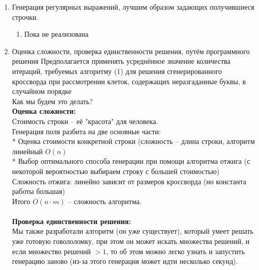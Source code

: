 \documentclass[12pt]{report}
\begin{document}
\begin{enumerate}
\newpage

\item Генерация регулярных выражений, лучшим образом задающих получившиеся строчки.
\begin{enumerate} 
\item Пока не реализована
\end{enumerate} 

\newpage

\item Оценка сложности, проверка единственности решения, путём программного решения
        Предполагается применять усреднённое значение количества итераций, требуемых алгоритму (1) для решения сгенерированного кроссворда при рассмотрении клеток, содержащих неразгаданные буквы, в случайном порядке
        \\
        
        Как мы будем это делать? \\
        {\bf Оценка сложности: } \\
        Стоимость строки -- её "красота" для человека. \\
        Генерация поля разбита на две основные части: \\
        * Оценка стоимости конкретной строки (сложность -- длина строки, алгоритм линейный $O(n)$ \\
        * Выбор оптимального способа генерации при помощи алгоритма отжига (с некоторой вероятностью выбираем строку с большей стоимостью) \\
        Сложность отжига: линейно зависит от размеров кроссворда (но константа работы большая) \\
        Итого $O(n \cdot m)$ -- сложность алгоритма. \\
        \\
        {\bf Проверка единственности решения: } \\
        Мы также разработали алгоритм (он уже существует), который умеет решать уже готовую говололомку, 
        при этом он может искать множества решений, и если множество решений $>1$, то об этом можно легко узнать 
        и запустить генерацию заново (из-за этого генерация может идти несколько секунд).
        

\end{enumerate}


    \newpage %
    
\end{document}
